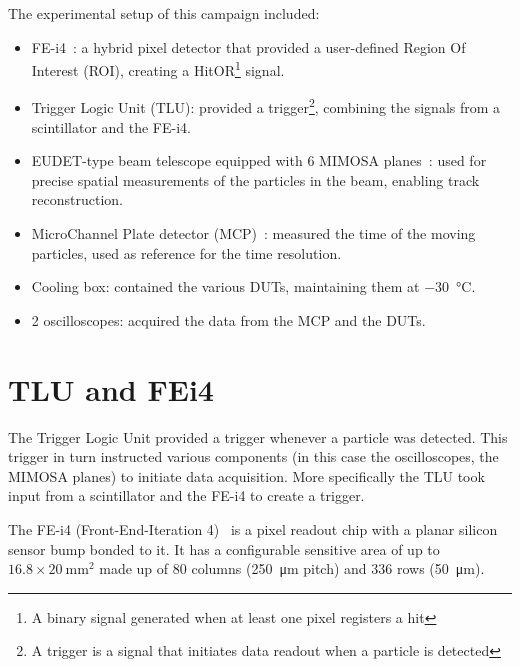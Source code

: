 The experimental setup of this campaign included:
\begin{itemize}
    \item FE-i4~\cite{Obermann:2014goa}: a hybrid pixel detector that provided a user-defined Region Of Interest (ROI), creating a HitOR\footnote{A binary signal generated when at least one pixel registers a hit} signal. %
    \item Trigger Logic Unit (TLU): provided a trigger\footnote{A trigger is a signal that initiates data readout when a particle is detected}, combining the signals from a scintillator and the FE-i4. %
    \item EUDET-type beam telescope equipped with 6 MIMOSA planes~\cite{Jansen:2016bkd}: used for precise spatial measurements of the particles in the beam, enabling track reconstruction.
    \item MicroChannel Plate detector (MCP)~\cite{LADISLASWIZA1979587}: measured the time of the moving particles, used as reference for the time resolution.
    \item Cooling box: contained the various DUTs, maintaining them at \qty{-30}{\degreeCelsius}.
    \item 2 oscilloscopes: acquired the data from the MCP and the DUTs. %
\end{itemize}



\section{TLU and FEi4}

The Trigger Logic Unit provided a trigger whenever a particle was detected. This trigger in turn instructed various components (in this case the oscilloscopes, the MIMOSA planes) to initiate data acquisition. More specifically the TLU took input from a scintillator and the FE-i4 to create a trigger.

The FE-i4 (Front-End-Iteration 4)~\cite{Obermann:2014goa} is a pixel readout chip with a planar silicon sensor bump bonded to it. It has a configurable sensitive area of up to \(\num{16.8} \times \qty{20}{\milli\meter^2}\) made up of 80 columns (\qty{250}{\micro\meter} pitch) and 336 rows (\qty{50}{\micro\meter}). 

